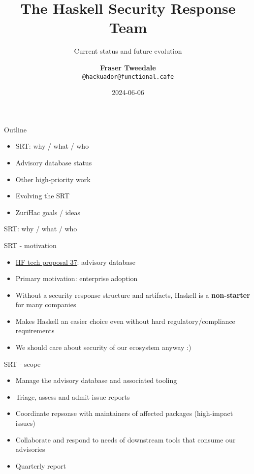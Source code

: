 \documentclass[ignorenonframetext,aspectratio=169,12pt]{beamer}
\title{\bf The Haskell Security Response Team}
\subtitle{Current status and future evolution}
\author{{\bf Fraser Tweedale}\\
    \texttt{@hackuador@functional.cafe}}
\date{2024-06-06}
\begin{document}
\frame{\titlepage}

\begin{frame}{Outline}
    \begin{itemize}
        \item SRT: why / what / who
        \item Advisory database status
        \item Other high-priority work
        \item Evolving the SRT
        \item ZuriHac goals / ideas
    \end{itemize}
\end{frame}

\begin{frame}
\centering
\Large
  SRT: why / what / who
\end{frame}

\begin{frame}{SRT - motivation}
  \begin{itemize}
    \item
      \href{https://github.com/david-christiansen/tech-proposals/blob/ae8d4ef73df24cd053f3b88683456a6cbc4757de/proposals/accepted/037-advisory-db.md}
        {HF tech proposal 37}: advisory database
    \item Primary motivation: enterprise adoption
    \item Without a security response structure and artifacts,
      Haskell is a {\bf non-starter} for many companies
    \item Makes Haskell an easier choice even without
      hard regulatory/compliance requirements
    \item We should care about security of our ecosystem anyway :)
  \end{itemize}
\end{frame}

\begin{frame}{SRT - scope}
    \begin{itemize}
        \item Manage the advisory database and associated tooling
        \item Triage, assess and admit issue reports
        \item Coordinate repsonse with maintainers of affected
            packages (high-impact issues)
        \item Collaborate and respond to needs of downstream tools
            that consume our advisories
        \item Quarterly report
    \end{itemize}
\end{frame}
\end{document}
